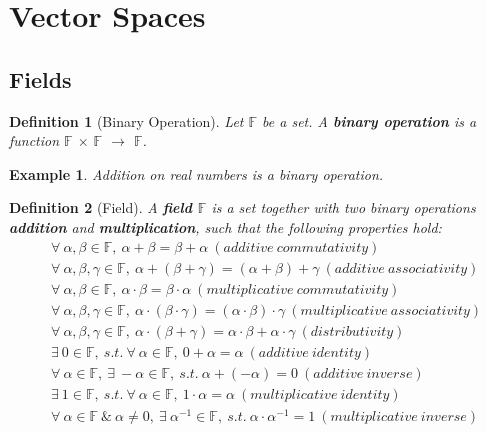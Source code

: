 \documentclass{article}
\newtheorem{definition}{Definition}[section] %
\newtheorem{example}{Example}[section]
\begin{document}
\newpage
\section{Vector Spaces}
\subsection{Fields}
\begin{definition}[Binary Operation] Let $\mathbb{F}$ be a set. A \textbf{binary operation} is a function $\mathbb{F}$ $\times$ $\mathbb{F}$ $\rightarrow$ $\mathbb{F}$.
\end{definition}
\begin{example} Addition on real numbers is a binary operation.
\end{example}

\begin{definition}[Field] A \textbf{field $\mathbb{F}$} is a set together with two binary operations \textbf{addition} and \textbf{multiplication}, such that the following properties hold:
    \begin{equation}
    \begin{split}
    & \forall \ \alpha, \beta \in \mathbb{F}, \ \alpha+\beta=\beta+\alpha \ (additive \ commutativity) \\
    & \forall \ \alpha, \beta, \gamma \in \mathbb{F}, \ \alpha+(\beta+\gamma)=(\alpha+\beta)+\gamma \ (additive \ associativity) \\
    & \forall \ \alpha, \beta \in \mathbb{F}, \ \alpha \cdot \beta = \beta \cdot \alpha \ (multiplicative \ commutativity) \\
    & \forall \ \alpha, \beta, \gamma \in \mathbb{F}, \ \alpha \cdot (\beta \cdot \gamma)=(\alpha \cdot \beta) \cdot \gamma \ (multiplicative \ associativity) \\
    & \forall \ \alpha, \beta, \gamma \in \mathbb{F}, \ \alpha \cdot (\beta + \gamma)=\alpha \cdot \beta + \alpha \cdot \gamma \ (distributivity) \\
    & \exists \ 0 \in \mathbb{F}, \ s.t. \ \forall \ \alpha \in \mathbb{F}, \ 0 + \alpha = \alpha \ (additive \ identity) \\
    & \forall \ \alpha \in \mathbb{F}, \ \exists \ -\alpha \in \mathbb{F}, \ s.t. \ \alpha + (-\alpha) = 0 \ (additive \ inverse) \\
    & \exists \ 1 \in \mathbb{F}, \ s.t. \ \forall \ \alpha \in \mathbb{F}, \ 1 \cdot \alpha = \alpha \ (multiplicative \ identity) \\
    & \forall \ \alpha \in \mathbb{F} \ \& \ \alpha \neq 0, \ \exists \ {\alpha}^{-1} \in \mathbb{F}, \ s.t. \ \alpha \cdot {\alpha}^{-1} = 1 \ (multiplicative \ inverse)
    \end{split}
    \end{equation}
\end{definition}
\end{document}
